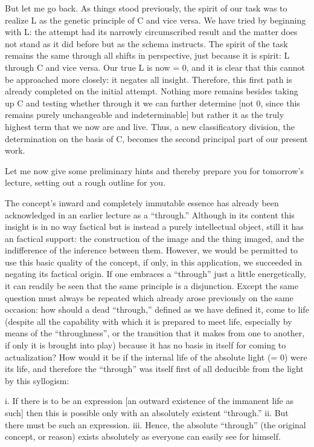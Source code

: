 But let me go back.
As things stood previously,
the spirit of our task was to realize
L as the genetic principle of C and vice versa.
We have tried by beginning with L:
the attempt had its narrowly circumscribed result
and the matter does not stand as it did before
but as the schema instructs.
The spirit of the task remains the same
through all shifts in perspective,
just because it is spirit:
L through C and vice versa.
Our true L is now = 0,
and it is clear that
this cannot be approached more closely:
it negates all insight.
Therefore, this first path is
already completed on the initial attempt.
Nothing more remains besides
taking up C and testing whether
through it we can further determine
[not 0, since this remains purely
unchangeable and indeterminable]
but rather it as the truly highest term
that we now are and live.
Thus, a new classificatory division,
the determination on the basis of C,
becomes the second principal part
of our present work.

Let me now give some preliminary hints
and thereby prepare you for tomorrow's lecture,
setting out a rough outline for you.

The concept's inward and completely immutable essence has
already been acknowledged in an earlier lecture as a “through.”
Although in its content this insight is in no way factical
but is instead a purely intellectual object,
still it has an factical support:
the construction of the image and the thing imaged,
and the indifference of the inference between them.
However, we would be permitted to use this basic quality of the concept,
if only, in this application, we succeeded in negating its factical origin.
If one embraces a “through” just a little energetically,
it can readily be seen that the same principle is a disjunction.
Except the same question must always be repeated which
already arose previously on the same occasion:
how should a dead “through,” defined as we have defined it,
come to life
(despite all the capability with
which it is prepared to meet life,
especially by means of the “throughness”,
or the transition that it makes from one to another,
if only it is brought into play)
because it has no basis in itself
for coming to actualization?
How would it be if the internal life
of the absolute light (= 0) were its life,
and therefore the “through” was itself
first of all deducible from the light by this syllogism:

i. If there is to be an expression
[an outward existence of the immanent life as such]
then this is possible only with an absolutely existent “through.”
ii. But there must be such an expression.
iii. Hence, the absolute “through” (the original concept, or reason)
exists absolutely as everyone can easily see for himself.

